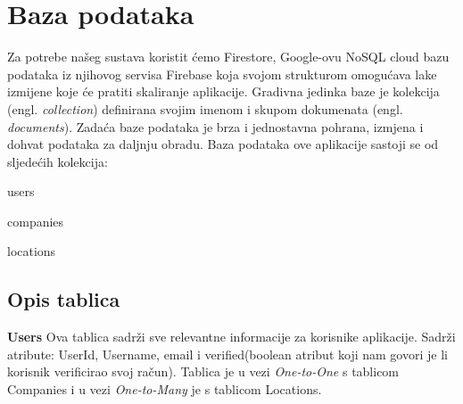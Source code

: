 	
		

		

				
		\section{Baza podataka}

  Za potrebe našeg sustava koristit ćemo Firestore, Google-ovu NoSQL cloud bazu podataka iz njihovog servisa Firebase koja svojom strukturom omogućava lake izmijene koje će pratiti skaliranje aplikacije. Gradivna jedinka baze je kolekcija (engl. \textit{collection}) definirana svojim imenom i skupom dokumenata (engl. \textit{documents}). Zadaća baze podataka je brza i jednostavna pohrana, izmjena i dohvat podataka za daljnju obradu. Baza podataka ove aplikacije sastoji se od sljedećih kolekcija:
  \begin{packed_item}
	
        	\item  users
        	\item  companies
        	\item  locations
            \end{packed_item}
		
			\subsection{Opis tablica}
			
				
				
				\textbf{Users}\hspace{1cm}  Ova tablica sadrži sve relevantne informacije za korisnike aplikacije. Sadrži atribute: UserId, Username, email i verified(boolean atribut koji nam govori je li korisnik verificirao svoj račun). Tablica je u vezi \textit{One-to-One} s tablicom Companies i u vezi \textit{One-to-Many} je s tablicom Locations. 

